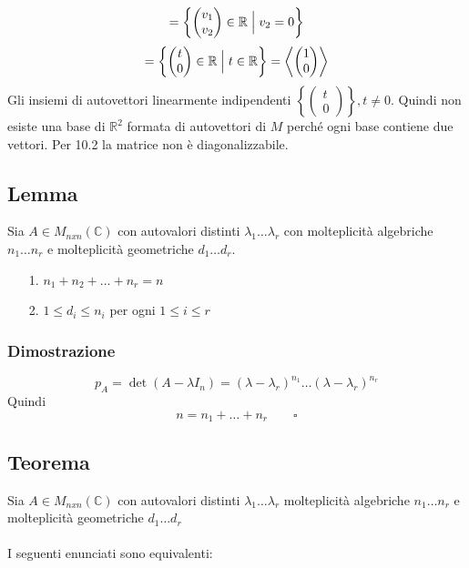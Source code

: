 \documentclass[12pt]{article}
\begin{document}
\[= \left\{\begin{pmatrix}
    v_1\\
    v_2
\end{pmatrix} \in \mathbb{R} \Bigm\vert v_2 = 0\right\}\]
\[= \left\{\begin{pmatrix}
    t\\
    0
\end{pmatrix} \in \mathbb{R} \Bigm\vert t \in \mathbb{R} \right\} = \left<\begin{pmatrix}
    1\\
    0
\end{pmatrix}\right>\]
Gli insiemi di autovettori linearmente indipendenti $\left\{\begin{pmatrix}
    t\\
    0
\end{pmatrix}\right\}, t \neq 0$. Quindi non esiste una base di $\mathbb{R}^2$ formata di autovettori di $M$ perché ogni base contiene due vettori. Per 10.2 la matrice non è diagonalizzabile.

\subsection{Lemma}

Sia $A \in M_{nxn} (\mathbb{C})$ con autovalori distinti $\lambda_1 \dots \lambda_r$ con molteplicità algebriche $n_1 \dots n_r$ e molteplicità geometriche $d_1 \dots d_r$.

\begin{enumerate}
    \item[1.] $n_1 + n_2 + \dots + n_r = n$
    \item[2.] $1 \le d_i \le n_i$ per ogni $1 \le i \le r$
\end{enumerate}

\subsubsection{Dimostrazione}

\[p_A = \det{(A-\lambda I_n)} = (\lambda - \lambda_r)^{n_1} \dots (\lambda - \lambda_r)^{n_r}\]
Quindi
\[n = n_1 + \dots + n_r \quad \quad \square\]

\subsection{Teorema}

Sia $A \in M_{nxn} (\mathbb{C})$ con autovalori distinti $\lambda_1 \dots \lambda_r$ molteplicità algebriche $n_1 \dots n_r$ e molteplicità geometriche $d_1 \dots d_r$
\\\\
I seguenti enunciati sono equivalenti:
\end{document}
